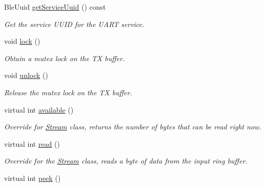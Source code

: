 \begin{DoxyCompactItemize}
Ble\+Uuid \mbox{\hyperlink{class_ble_serial_peripheral_base_a0457f2495023d47468a2f5b1964c0233}{get\+Service\+Uuid}} () const
\begin{DoxyCompactList}\small\item\em Get the service U\+U\+ID for the U\+A\+RT service. \end{DoxyCompactList}\item 
void \mbox{\hyperlink{class_ble_serial_peripheral_base_a4dac5d6f8efb72b1df255e942a054560}{lock}} ()
\begin{DoxyCompactList}\small\item\em Obtain a mutex lock on the TX buffer. \end{DoxyCompactList}\item 
void \mbox{\hyperlink{class_ble_serial_peripheral_base_ab6c9183c6e2d42babe005b222b984d03}{unlock}} ()
\begin{DoxyCompactList}\small\item\em Release the mutex lock on the TX buffer. \end{DoxyCompactList}\item 
\mbox{\label{class_ble_serial_peripheral_base_a946cc56677f03db99de9409851427941}} 
virtual int \mbox{\hyperlink{class_ble_serial_peripheral_base_a946cc56677f03db99de9409851427941}{available}} ()
\begin{DoxyCompactList}\small\item\em Override for \mbox{\hyperlink{class_stream}{Stream}} class, returns the number of bytes that can be read right now. \end{DoxyCompactList}\item 
\mbox{\label{class_ble_serial_peripheral_base_a4933bc35d89028134597b46315806ce4}} 
virtual int \mbox{\hyperlink{class_ble_serial_peripheral_base_a4933bc35d89028134597b46315806ce4}{read}} ()
\begin{DoxyCompactList}\small\item\em Override for the \mbox{\hyperlink{class_stream}{Stream}} class, reads a byte of data from the input ring buffer. \end{DoxyCompactList}\item 
\mbox{\label{class_ble_serial_peripheral_base_a6ba8319f3b1a69c96c4e8b3f8dde5bbc}} 
virtual int \mbox{\hyperlink{class_ble_serial_peripheral_base_a6ba8319f3b1a69c96c4e8b3f8dde5bbc}{peek}} ()

\end{DoxyCompactItemize}
